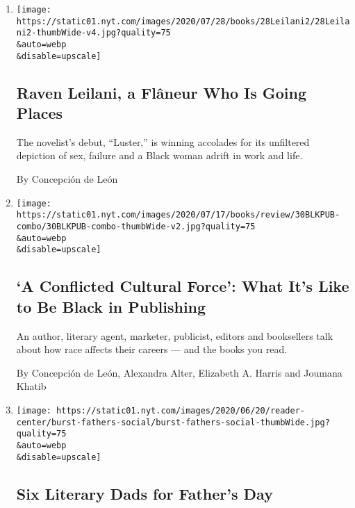 \begin{enumerate}
\def\labelenumi{\arabic{enumi}.}
\item
  \href{/2020/07/31/books/raven-leilani-luster.html}{}

  \texttt{[image: https://static01.nyt.com/images/2020/07/28/books/28Leilani2/28Leilani2-thumbWide-v4.jpg?quality=75\\\&auto=webp\\\&disable=upscale]}

  \hypertarget{raven-leilani-a-fluxe2neur-who-is-going-places}{%
  \subsection{Raven Leilani, a Flâneur Who Is Going
  Places}\label{raven-leilani-a-fluxe2neur-who-is-going-places}}

  The novelist's debut, ``Luster,'' is winning accolades for its
  unfiltered depiction of sex, failure and a Black woman adrift in work
  and life.

  By Concepción de León
\item
  \href{/2020/07/01/books/book-publishing-black.html}{}

  \texttt{[image: https://static01.nyt.com/images/2020/07/17/books/review/30BLKPUB-combo/30BLKPUB-combo-thumbWide-v2.jpg?quality=75\\\&auto=webp\\\&disable=upscale]}

  \hypertarget{a-conflicted-cultural-force-what-its-like-to-be-black-in-publishing}{%
  \subsection{`A Conflicted Cultural Force': What It's Like to Be Black
  in
  Publishing}\label{a-conflicted-cultural-force-what-its-like-to-be-black-in-publishing}}

  An author, literary agent, marketer, publicist, editors and
  booksellers talk about how race affects their careers --- and the
  books you read.

  By Concepción de León, Alexandra Alter, Elizabeth A. Harris and
  Joumana Khatib
\item
  \href{/interactive/2020/06/20/burst/books-fathers-day.html}{}

  \texttt{[image: https://static01.nyt.com/images/2020/06/20/reader-center/burst-fathers-social/burst-fathers-social-thumbWide.jpg?quality=75\\\&auto=webp\\\&disable=upscale]}

  \hypertarget{six-literary-dads-for-fathers-day}{%
  \subsection{Six Literary Dads for Father's
  Day}\label{six-literary-dads-for-fathers-day}}


\end{enumerate}
